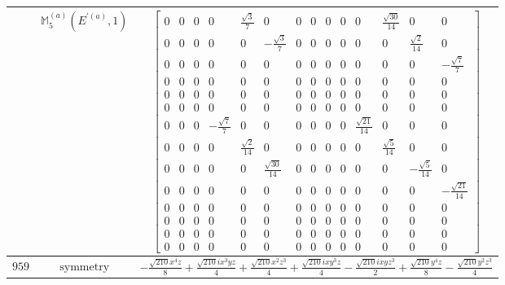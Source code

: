 \documentclass[fleqn,8pt,landscape]{jsarticle}
\begin{document}
\begin{longtable}{ccc}
$  $ & $ \mathbb{M}_{5}^{(a)}(E^{\prime(a)},1) $ & $ \begin{bmatrix} 0 & 0 & 0 & 0 & \frac{\sqrt{3}}{7} & 0 & 0 & 0 & 0 & 0 & 0 & \frac{\sqrt{30}}{14} & 0 & 0 \\ 0 & 0 & 0 & 0 & 0 & - \frac{\sqrt{3}}{7} & 0 & 0 & 0 & 0 & 0 & 0 & \frac{\sqrt{2}}{14} & 0 \\ 0 & 0 & 0 & 0 & 0 & 0 & 0 & 0 & 0 & 0 & 0 & 0 & 0 & - \frac{\sqrt{7}}{7} \\ 0 & 0 & 0 & 0 & 0 & 0 & 0 & 0 & 0 & 0 & 0 & 0 & 0 & 0 \\ 0 & 0 & 0 & 0 & 0 & 0 & 0 & 0 & 0 & 0 & 0 & 0 & 0 & 0 \\ 0 & 0 & 0 & 0 & 0 & 0 & 0 & 0 & 0 & 0 & 0 & 0 & 0 & 0 \\ 0 & 0 & 0 & - \frac{\sqrt{7}}{7} & 0 & 0 & 0 & 0 & 0 & 0 & \frac{\sqrt{21}}{14} & 0 & 0 & 0 \\ 0 & 0 & 0 & 0 & \frac{\sqrt{2}}{14} & 0 & 0 & 0 & 0 & 0 & 0 & \frac{\sqrt{5}}{14} & 0 & 0 \\ 0 & 0 & 0 & 0 & 0 & \frac{\sqrt{30}}{14} & 0 & 0 & 0 & 0 & 0 & 0 & - \frac{\sqrt{5}}{14} & 0 \\ 0 & 0 & 0 & 0 & 0 & 0 & 0 & 0 & 0 & 0 & 0 & 0 & 0 & - \frac{\sqrt{21}}{14} \\ 0 & 0 & 0 & 0 & 0 & 0 & 0 & 0 & 0 & 0 & 0 & 0 & 0 & 0 \\ 0 & 0 & 0 & 0 & 0 & 0 & 0 & 0 & 0 & 0 & 0 & 0 & 0 & 0 \\ 0 & 0 & 0 & 0 & 0 & 0 & 0 & 0 & 0 & 0 & 0 & 0 & 0 & 0 \\ 0 & 0 & 0 & 0 & 0 & 0 & 0 & 0 & 0 & 0 & 0 & 0 & 0 & 0 \end{bmatrix} $ \\ \hline
$ 959 $ & $ \text{symmetry} $ & $ - \frac{\sqrt{210} x^{4} z}{8} + \frac{\sqrt{210} i x^{3} y z}{4} + \frac{\sqrt{210} x^{2} z^{3}}{4} + \frac{\sqrt{210} i x y^{3} z}{4} - \frac{\sqrt{210} i x y z^{3}}{2} + \frac{\sqrt{210} y^{4} z}{8} - \frac{\sqrt{210} y^{2} z^{3}}{4} $ \\

\end{longtable}
\end{document}
